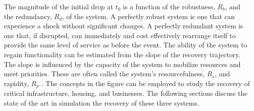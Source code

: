 \begin{partbacktext}
The magnitude of the initial drop at $t_0$ is a function of the robustness, $R_b$, and the redundancy, $R_d$, of the system. A perfectly robust system is one that can experience a shock without significant changes. A perfectly redundant system is one that, if disrupted, can immediately and cost effectively rearrange itself to provide the same level of service as before the event. The ability of the system to regain functionality can be estimated from the slope of the recovery trajectory. The slope is influenced by the capacity of the system to mobilize resources and meet priorities. These are often called the system's resourcefulness, $R_s$, and rapidity, $R_p$ \citep{Bruneau2003}. The concepts in the figure can be employed to study the recovery of critical infrastructure, housing, and businesses. The following sections discuss the state of the art in simulation the recovery of these three systems.

\FloatBarrier
\end{partbacktext}
